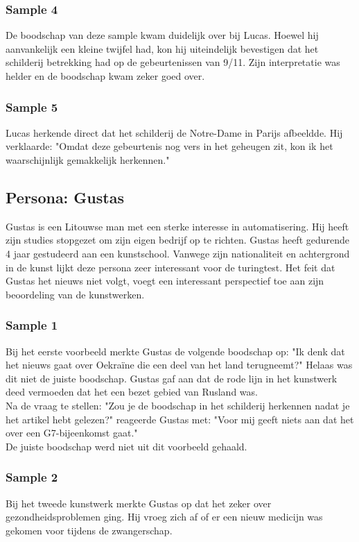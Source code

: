 \subsubsection{Sample 4}
De boodschap van deze sample kwam duidelijk over bij Lucas. Hoewel hij aanvankelijk een kleine twijfel had, kon hij uiteindelijk bevestigen dat het schilderij betrekking had op de gebeurtenissen van 9/11. Zijn interpretatie was helder en de boodschap kwam zeker goed over.

\subsubsection{Sample 5}
Lucas herkende direct dat het schilderij de Notre-Dame in Parijs afbeeldde. Hij verklaarde: "Omdat deze gebeurtenis nog vers in het geheugen zit, kon ik het waarschijnlijk gemakkelijk herkennen."

\subsection{Persona: Gustas}
Gustas is een Litouwse man met een sterke interesse in automatisering. Hij heeft zijn studies stopgezet om zijn eigen bedrijf op te richten. Gustas heeft gedurende 4 jaar gestudeerd aan een kunstschool. Vanwege zijn nationaliteit en achtergrond in de kunst lijkt deze persona zeer interessant voor de turingtest. Het feit dat Gustas het nieuws niet volgt, voegt een interessant perspectief toe aan zijn beoordeling van de kunstwerken.

\subsubsection{Sample 1}
Bij het eerste voorbeeld merkte Gustas de volgende boodschap op: "Ik denk dat het nieuws gaat over Oekraïne die een deel van het land terugneemt?" Helaas was dit niet de juiste boodschap. Gustas gaf aan dat de rode lijn in het kunstwerk deed vermoeden dat het een bezet gebied van Rusland was. \\

Na de vraag te stellen: "Zou je de boodschap in het schilderij herkennen nadat je het artikel hebt gelezen?" reageerde Gustas met: "Voor mij geeft niets aan dat het over een G7-bijeenkomst gaat." \\

De juiste boodschap werd niet uit dit voorbeeld gehaald.

\subsubsection{Sample 2}
Bij het tweede kunstwerk merkte Gustas op dat het zeker over gezondheidsproblemen ging. Hij vroeg zich af of er een nieuw medicijn was gekomen voor tijdens de zwangerschap. \\

